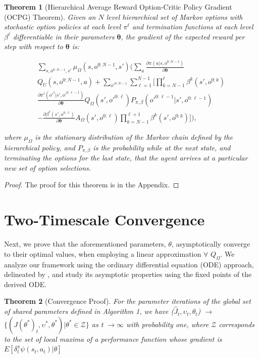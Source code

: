 \documentclass[letterpaper]{article} %
\newtheorem{theorem}{Theorem}
\newcommand{\citet}[1]{\citeauthor{#1} \shortcite{#1}}
\begin{document}
\begin{theorem}[Hierarchical Average Reward Option-Critic Policy Gradient (OCPG) Theorem]
\label{HARPG}
Given an $N$ level hierarchical set of  Markov  options  with  stochastic  option  policies at each level $\pi^\ell$ and termination functions at each level $\beta^\ell$ differentiable in their parameters $\bm{\theta}$, the gradient of the expected reward per step with respect to $\bm{\theta}$ is:

\begin{footnotesize}
\begin{align*}
    \sum_{s,o^{0:N-1},s'}\!\!\!\!\mu_\Omega(s,o^{0:N-1},s')
    \bigg(\sum_{a} \frac{\partial \pi(a|s,o^{0:N-1})}{\partial \bm{\theta}} \\
    Q_U(s,o^{0:N-1},a) +  \sum_{o'^{0:N-1}} \sum_{\ell=1}^{N-1} \bigg[ \!\prod_{k=N-1}^{\ell}\!\!\!\!\beta^k(s',o^{0:k}) \\ \frac{\partial \pi^\ell(o'^\ell|s',o'^{0:\ell-1})}{\partial \bm{\theta}} Q_\Omega(s',o'^{0:\ell}) P_{\pi,\beta}(o'^{0:\ell-1}|s',o^{0:\ell-1}) \\
    - \frac{\partial \beta^\ell(s',o^{0:\ell})}{\partial \bm{\theta}} A_\Omega(s',o^{0:\ell})\!\!\!\!\prod_{k=N-1}^{\ell+1}\!\!\!\!\beta^k(s',o^{0:k}) \bigg] \bigg),
\end{align*}
\end{footnotesize}
where $\mu_\Omega$ is the stationary distribution of the Markov chain defined by the hierarchical policy, and $P_{\pi,\beta}$ is the probability while at the next state, and terminating the options for the last state, that the agent arrives at a particular new set of option selections.
\end{theorem}

\begin{proof}
The proof for this theorem is in the Appendix.
\end{proof}

\section{Two-Timescale Convergence}
Next, we prove that the aforementioned parameters, $\theta$, asymptotically converge to their optimal values, when employing a linear approximation $\forall$ $Q_\Omega$.
We analyze our framework using the ordinary differential equation (ODE) approach, delineated by \citet{bhatnagar2009natural}, and study its asymptotic properties using the fixed points of the derived ODE.


\begin{theorem}[Convergence Proof]
\label{conv}
For the parameter iterations of the global set of shared parameters defined in Algorithm 1, we have ($\hat{J}_{t}, \upsilon_{t}, \theta_{t} $) $\to$ $\{(J(\theta^{*})_{t}, \upsilon^{*}, \theta^{*} )|\theta^{*} \in \mathcal{Z}\}$ as t $\to \infty$ with probability one, where $\mathcal{Z}$ corresponds to the set of local maxima of a performance function whose gradient is $E[\delta^{\pi}_{t}\psi(s_{t},a_{t})|\theta]$
\end{theorem}
\end{document}
